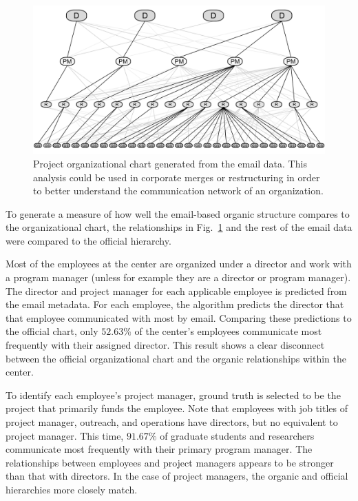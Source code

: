 \documentclass[10pt,twocolumn,conference]{IEEEtran}
\begin{document}
\begin{figure}[t]
	\centering
	\includegraphics[width=\columnwidth,trim={0mm 1mm 0mm 1mm},clip]{orgChart_3con_BW}
	\caption{Project organizational chart generated from the email data. This analysis could be used in corporate merges or restructuring in order to better understand the communication network of an organization.}
	\label{fig:org_chart}
\end{figure}

To generate a measure of how well the email-based organic structure compares to the organizational chart, the relationships in Fig.~\ref{fig:org_chart} and the rest of the email data were compared to the official hierarchy.

Most of the employees at the center are organized under a director and work with a program manager (unless for example they are a director or program manager).
The director and project manager for each applicable employee is predicted from the email metadata. 
For each employee, the algorithm predicts the director that that employee communicated with most by email.
Comparing these predictions to the official chart, only $52.63\%$ of the center's employees communicate most frequently with their assigned director.
This result shows a clear disconnect between the official organizational chart and the organic relationships within the center.

To identify each employee's project manager, ground truth is selected to be the project that primarily funds the employee.
Note that employees with job titles of project manager, outreach, and operations have directors, but no equivalent to project manager.
This time, $91.67\%$ of graduate students and researchers communicate most frequently with their primary program manager.
The relationships between employees and project managers appears to be stronger than that with directors.
In the case of project managers, the organic and official hierarchies more closely match.
\end{document}

